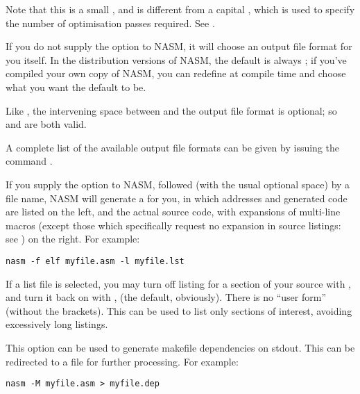 Note that this is a small , and is different from a capital
, which is used to specify the number of optimisation passes
required. See .


If you do not supply the  option to NASM, it will choose an
output file format for you itself. In the distribution versions of
NASM, the default is always ; if you've compiled
your own copy of NASM, you can redefine 
at compile time and choose what you want the default to be.

Like , the intervening space between  and the output
file format is optional; so  and  are both valid.

A complete list of the available output file formats can be given by
issuing the command .


If you supply the  option to NASM, followed (with the usual
optional space) by a file name, NASM will generate a 
for you, in which addresses and generated code are listed on the left, and the
actual source code, with expansions of multi-line macros (except those which
specifically request no expansion in source listings: see )
on the right. For example:

\begin{lstlisting}
nasm -f elf myfile.asm -l myfile.lst
\end{lstlisting}

If a list file is selected, you may turn off listing for a section of your
source with \code{[list -]}, and turn it back on with \code{[list +]},
(the default, obviously). There is no ``user form'' (without the brackets).
This can be used to list only sections of interest, avoiding excessively
long listings.


This option can be used to generate makefile dependencies on stdout.
This can be redirected to a file for further processing. For example:

\begin{lstlisting}
nasm -M myfile.asm > myfile.dep
\end{lstlisting}

